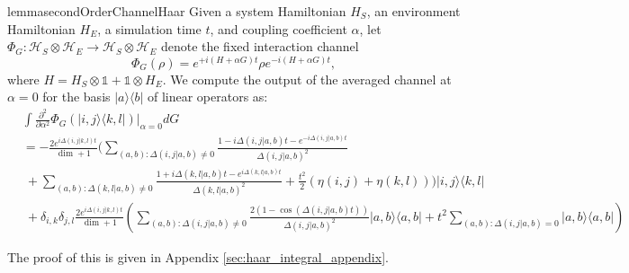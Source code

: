 \documentclass{article}
\newcommand{\ketbra}[2]{| #1\rangle\! \langle #2|}
\newcommand{\parens}[1]{\left( #1 \right)}
\newcommand{\hilb}{\mathcal{H}}
\newcommand{\identity}{\mathds{1}}
\begin{document}
\begin{restatable}{lemma}{secondOrderChannelHaar} \label{lem:big_one}
    Given a system Hamiltonian $H_{S}$, an environment Hamiltonian $H_{E}$, a simulation time $t$, and coupling coefficient $\alpha$, let $\Phi_G : \hilb_S \otimes \hilb_E \to \hilb_S \otimes \hilb_E$ denote the fixed interaction channel 
    \begin{equation}
        \Phi_G(\rho) = e^{+i (H + \alpha G)t} \rho e^{-i (H + \alpha G)t},
    \end{equation}
    where $H = H_S \otimes \identity + \identity \otimes H_E$. We compute the output of the averaged channel at $\alpha = 0$ for the basis $\ketbra{a}{b}$ of linear operators as:
 \begin{align}
     &\int \frac{\partial^2}{\partial \alpha^2} \Phi_G(\ketbra{i,j}{k,l})\bigg|_{\alpha = 0} dG \\
     &= -\frac{2  e^{i \Delta(i,j|k,l) t}}{\dim + 1} \bigg(\sum_{(a,b): \Delta(i,j|a,b) \neq 0} \frac{1 - i \Delta(i,j|a,b)t - e^{-i \Delta(i,j|a,b) t}}{\Delta(i,j|a,b)^2} \nonumber \\
     &~+ \sum_{(a,b): \Delta(k,l|a,b) \neq 0} \frac{1 + i \Delta(k,l|a,b) t - e^{i \Delta(k,l|a,b) t}}{\Delta(k,l|a,b)^2} + \frac{t^2}{2}(\eta(i,j) + \eta(k,l)) \bigg) \ketbra{i,j}{k,l} \nonumber \\
    &~ +\delta_{i,k} \delta_{j,l} \frac{2 e^{i \Delta(i,j|k,l)t}}{\dim+1} \parens{ \sum_{(a,b): \Delta(i,j|a,b) \neq 0 } \frac{2(1- \cos (\Delta(i,j|a,b)t))}{\Delta(i,j|a,b)^2} \ketbra{a,b}{a,b} + t^2 \sum_{(a,b) : \Delta(i,j|a,b) = 0} \ketbra{a,b}{a,b}}
 \end{align}
\end{restatable}
The proof of this is given in Appendix \ref{sec:haar_integral_appendix}. 
\end{document}
